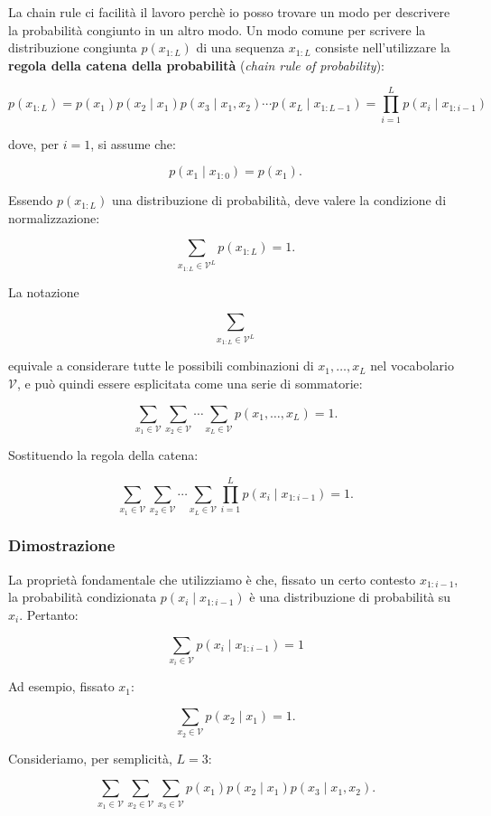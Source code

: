 La chain rule ci facilità il lavoro perchè io posso trovare un modo per descrivere la probabilità congiunto in un altro modo.
Un modo comune per scrivere la distribuzione congiunta $p(x_{1:L})$ di una sequenza $x_{1:L}$ consiste nell'utilizzare la \textbf{regola della catena della probabilità} (\textit{chain rule of probability}):

$$
p(x_{1:L})
=
p(x_1)p(x_2\mid x_1)p(x_3\mid x_1,x_2)\cdots
p(x_L\mid x_{1:L-1})
=
\prod_{i=1}^{L}p(x_i\mid x_{1:i-1})
$$

dove, per $i=1$, si assume che:

$$
p(x_1\mid x_{1:0}) = p(x_1).
$$

Essendo $p(x_{1:L})$ una distribuzione di probabilità, deve valere la condizione di normalizzazione:

$$
\sum_{x_{1:L}\in\mathcal V^L}p(x_{1:L})=1.
$$

La notazione

$$
\sum_{x_{1:L}\in\mathcal V^L}
$$

equivale a considerare tutte le possibili combinazioni di $x_1,\ldots,x_L$ nel vocabolario $\mathcal V$, e può quindi essere esplicitata come una serie di sommatorie:

$$
\sum_{x_1\in\mathcal V}
\sum_{x_2\in\mathcal V}
\cdots
\sum_{x_L\in\mathcal V}
p(x_1,\ldots,x_L)
=1.
$$

Sostituendo la regola della catena:

$$
\sum_{x_1\in\mathcal V}
\sum_{x_2\in\mathcal V}
\cdots
\sum_{x_L\in\mathcal V}
\prod_{i=1}^{L}p(x_i\mid x_{1:i-1})
=1.
$$

\subsubsection{Dimostrazione}

La proprietà fondamentale che utilizziamo è che, fissato un certo contesto $x_{1:i-1}$, la probabilità condizionata $p(x_i\mid x_{1:i-1})$ è una distribuzione di probabilità su $x_i$. Pertanto:

$$
\boxed{
\sum_{x_i\in\mathcal V}
p(x_i\mid x_{1:i-1})=1
}
$$

Ad esempio, fissato $x_1$:

$$
\sum_{x_2\in\mathcal V}p(x_2\mid x_1)=1.
$$

Consideriamo, per semplicità, $L=3$:

$$
\sum_{x_1\in\mathcal V}
\sum_{x_2\in\mathcal V}
\sum_{x_3\in\mathcal V}
p(x_1)p(x_2\mid x_1)p(x_3\mid x_1,x_2).
$$

